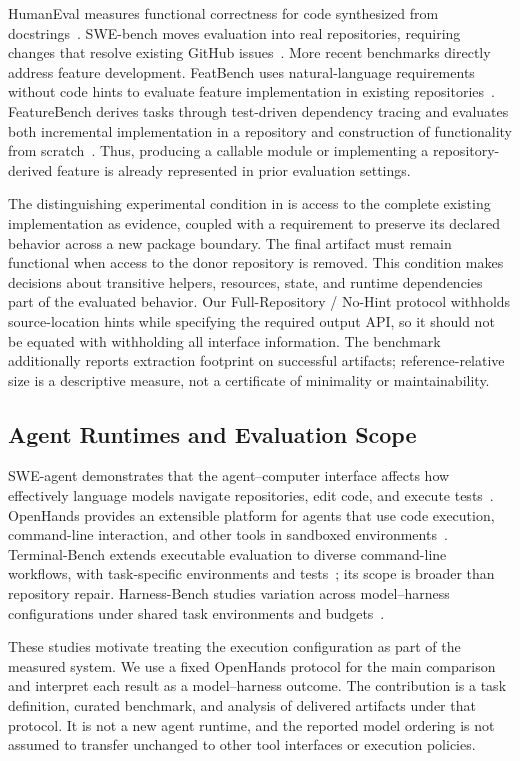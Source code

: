 HumanEval measures functional correctness for code synthesized from
docstrings~\cite{chen2021codex}. SWE-bench moves evaluation into real repositories,
requiring changes that resolve existing GitHub
issues~\cite{jimenez2024swebench}. More recent benchmarks directly address feature
development. FeatBench uses natural-language requirements without code hints to
evaluate feature implementation in existing
repositories~\cite{chen2026featbench}. FeatureBench derives tasks through
test-driven dependency tracing and evaluates both incremental implementation in a
repository and construction of functionality from
scratch~\cite{zhou2026featurebench}. Thus, producing a callable module or
implementing a repository-derived feature is already represented in prior
evaluation settings.

The distinguishing experimental condition in \flb is access to the complete
existing implementation as evidence, coupled with a requirement to preserve its
declared behavior across a new package boundary. The final artifact must remain
functional when access to the donor repository is removed. This condition makes
decisions about transitive helpers, resources, state, and runtime dependencies
part of the evaluated behavior. Our Full-Repository / No-Hint protocol withholds
source-location hints while specifying the required output API, so it should not
be equated with withholding all interface information. The benchmark additionally
reports extraction footprint on successful artifacts; reference-relative size is
a descriptive measure, not a certificate of minimality or maintainability.

\subsection{Agent Runtimes and Evaluation Scope}

SWE-agent demonstrates that the agent--computer interface affects how effectively
language models navigate repositories, edit code, and execute
tests~\cite{yang2024sweagent}. OpenHands provides an extensible platform for agents
that use code execution, command-line interaction, and other tools in sandboxed
environments~\cite{wang2025openhands}. Terminal-Bench extends executable
evaluation to diverse command-line workflows, with task-specific environments and
tests~\cite{merrill2026terminalbench}; its scope is broader than repository repair.
Harness-Bench studies variation across model--harness configurations under shared
task environments and budgets~\cite{yao2026harnessbench}.

These studies motivate treating the execution configuration as part of the
measured system. We use a fixed OpenHands protocol for the main comparison and
interpret each result as a model--harness outcome. The contribution is a task
definition, curated benchmark, and analysis of delivered artifacts under that
protocol. It is not a new agent runtime, and the reported model ordering is not
assumed to transfer unchanged to other tool interfaces or execution policies.
